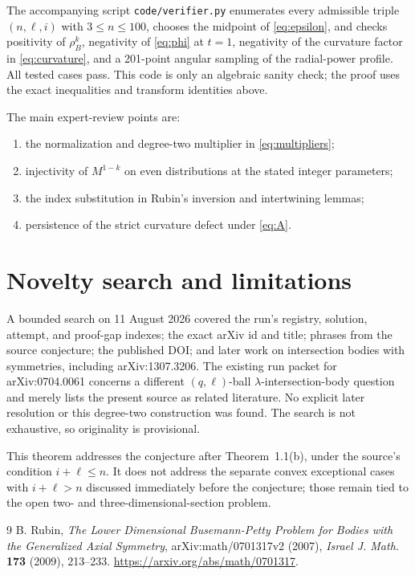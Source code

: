\documentclass[11pt]{article}
\begin{document}
The accompanying script \texttt{code/verifier.py} enumerates every admissible
triple $(n,\ell,i)$ with $3\leq n\leq100$, chooses the midpoint of
\eqref{eq:epsilon}, and checks positivity of $\rho_B^k$, negativity of
\eqref{eq:phi} at $t=1$, negativity of the curvature factor in
\eqref{eq:curvature}, and a 201-point angular sampling of the radial-power
profile.  All tested cases pass.  This code is only an algebraic sanity
check; the proof uses the exact inequalities and transform identities above.

The main expert-review points are:
\begin{enumerate}
\item the normalization and degree-two multiplier in
  \eqref{eq:multipliers};
\item injectivity of $M^{1-k}$ on even distributions at the stated integer
  parameters;
\item the index substitution in Rubin's inversion and intertwining lemmas;
\item persistence of the strict curvature defect under \eqref{eq:A}.
\end{enumerate}

\section{Novelty search and limitations}

A bounded search on 11 August 2026 covered the run's registry, solution,
attempt, and proof-gap indexes; the exact arXiv id and title; phrases from the
source conjecture; the published DOI; and later work on intersection bodies
with symmetries, including arXiv:1307.3206.  The existing run packet for
arXiv:0704.0061 concerns a different $(q,\ell)$-ball
$\lambda$-intersection-body question and merely lists the present source as
related literature.  No explicit later resolution or this degree-two
construction was found.  The search is not exhaustive, so originality is
provisional.

This theorem addresses the conjecture after Theorem~1.1(b), under the
source's condition $i+\ell\leq n$.  It does not address the separate convex
exceptional cases with $i+\ell>n$ discussed immediately before the conjecture;
those remain tied to the open two- and three-dimensional-section problem.

\begin{thebibliography}{9}
B. Rubin,
\emph{The Lower Dimensional Busemann-Petty Problem for Bodies with the
Generalized Axial Symmetry},
arXiv:math/0701317v2 (2007),
\emph{Israel J. Math.} \textbf{173} (2009), 213--233.
\url{https://arxiv.org/abs/math/0701317}.
\end{thebibliography}
\end{document}
